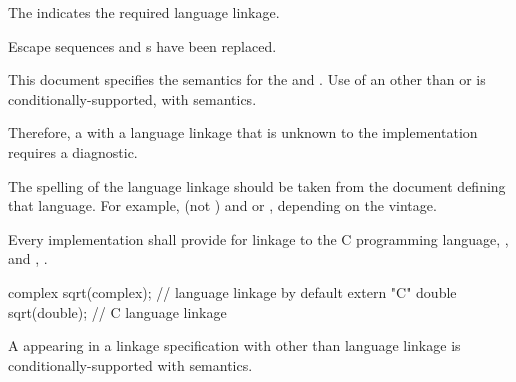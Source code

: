 The  indicates the required language linkage.
\begin{note}
Escape sequences and s
have been replaced.
\end{note}
This document specifies the semantics for the
  and .
Use of an 
other than  or  is conditionally-supported,
with  semantics.
\begin{note}
Therefore, a  with a language linkage
that is unknown to the implementation requires a diagnostic.
\end{note}

\recommended
The spelling of the language linkage should be taken
from the document defining that language.
For example,  (not ) and
 or , depending on the vintage.

\pnum
{}%
Every implementation shall provide for linkage to the C programming language,
%
, and \Cpp{}, .
\begin{example}
\begin{codeblock}
complex sqrt(complex);          // \Cpp{} language linkage by default
extern "C" {
  double sqrt(double);          // C language linkage
}
\end{codeblock}
\end{example}

\pnum
A  appearing in
a linkage specification with other than \Cpp{} language linkage
is conditionally-supported with
 semantics.

